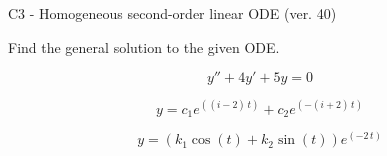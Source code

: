 \begin{exercise}
  \begin{exerciseTitle}C3 - Homogeneous second-order linear ODE (ver. 40)\end{exerciseTitle}
  \begin{exerciseStatement}
    
Find the general solution to the given ODE.

    
\[y''+4y'+5y = 0\]

  \end{exerciseStatement}
  \begin{exerciseAnswer}
    
\[y= c_{1} e^{\left(\left(i - 2\right) \, t\right)} + c_{2} e^{\left(-\left(i + 2\right) \, t\right)}\]

    
\[y= {\left(k_{1} \cos\left(t\right) + k_{2} \sin\left(t\right)\right)} e^{\left(-2 \, t\right)}\]

  \end{exerciseAnswer}
\end{exercise}